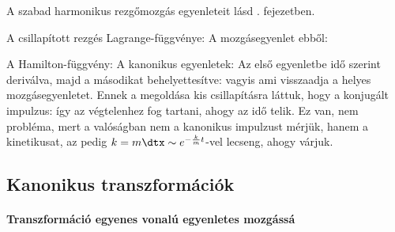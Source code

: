    A szabad harmonikus rezgőmozgás egyenleteit lásd . fejezetben. 
   
   A csillapított rezgés Lagrange-függvénye:
   A mozgásegyenlet ebből:
   
   A Hamilton-függvény:
   A kanonikus egyenletek:
   Az első egyenletbe idő szerint deriválva, majd a másodikat behelyettesítve:
   vagyis 
   ami visszaadja a helyes mozgásegyenletet.
   Ennek a megoldása kis csillapításra láttuk, hogy 
   a konjugált impulzus:
   így az végtelenhez fog tartani, ahogy az idő telik.
   Ez van, nem probléma, mert a valóságban nem a kanonikus impulzust mérjük, hanem a kinetikusat, az pedig $k=m\dtx\sim e^{-\frac{k}{m}t}$-vel lecseng, ahogy várjuk.
   
  \subsection{Kanonikus transzformációk}
   
   \paragraph{Transzformáció egyenes vonalú egyenletes mozgássá}
    
